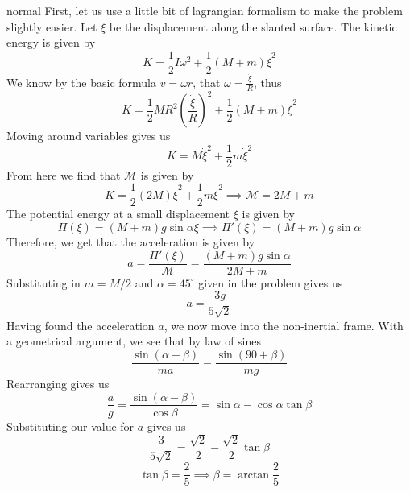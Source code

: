 \begin{solution}{normal}
First, let us use a little bit of lagrangian formalism to make the problem slightly easier. Let $\xi$ be the displacement along the slanted surface. The kinetic energy is given by
\[
K = \frac{1}{2}I\omega^2 + \frac{1}{2}(M + m)\dot\xi^2
\]We know by the basic formula $v=\omega r$, that $\omega = \frac{\dot\xi}{R}$, thus
\[
K = \frac{1}{2}MR^2\left(\frac{\dot\xi}{R}\right)^2 + \frac{1}{2}(M + m)\dot\xi^2 
\]Moving around variables gives us
\[
K = M\dot\xi^2 + \frac{1}{2}m\dot\xi^2
\]From here we find that $\mathcal{M}$ is given by
\[
K = \frac{1}{2}(2M)\dot\xi^2 + \frac{1}{2}m\dot\xi^2\implies \mathcal{M} = 2M + m
\]The potential energy at a small displacement $\xi$ is given by
\[
\Pi (\xi) = (M + m)g\sin\alpha\xi\implies \Pi' (\xi) = (M + m)g\sin\alpha
\]Therefore, we get that the acceleration is given by
\[a = \frac{\Pi' (\xi)}{\mathcal{M}} = \frac{(M + m)g\sin\alpha}{2M + m}
\]Substituting in $m = M/2$ and $\alpha = 45^{\circ}$ given in the problem gives us
\[
a = \frac{3g}{5\sqrt 2} 
\]Having found the acceleration $a$, we now move into the non-inertial frame. With a geometrical argument, we see that by law of sines
\[
\frac{\sin (\alpha - \beta)}{ma} = \frac{\sin (90 + \beta)}{mg}
\]Rearranging gives us
\[\frac{a}{g} = \frac{\sin (\alpha - \beta)}{\cos\beta} = \sin\alpha - \cos\alpha\tan\beta
\]Substituting our value for $a$ gives us
\[
\frac{3}{5\sqrt 2} = \frac{\sqrt 2}{2} - \frac{\sqrt 2}{2}\tan\beta
\]\[
\tan\beta= \frac{2}{5}\implies \boxed{\beta = \arctan\frac{2}{5}}
\]
\end{solution}
